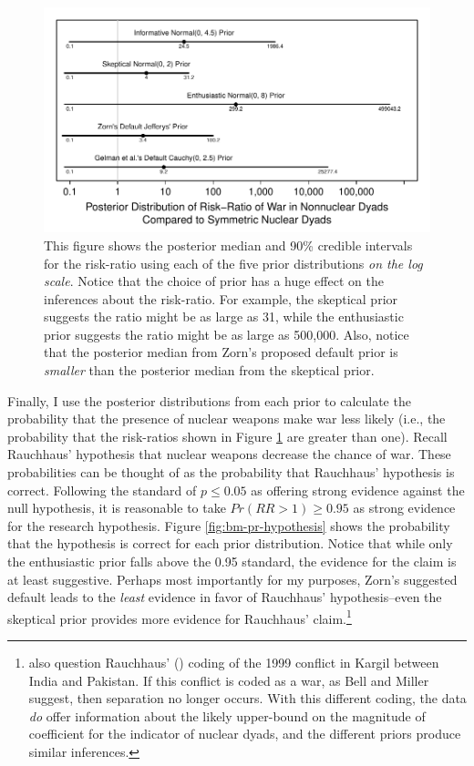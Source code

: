 \documentclass[12pt]{article}
\begin{document}
\begin{figure}[H]
\begin{center}
\includegraphics[scale = .8]{figs/bm-rr.pdf}
\caption{This figure shows the posterior median and 90\% credible intervals for the risk-ratio using each of the five prior distributions \emph{on the log scale}. Notice that the choice of prior has a huge effect on the inferences about the risk-ratio. For example, the skeptical prior suggests the ratio might be as large as 31, while the enthusiastic prior suggests the ratio might be as large as 500,000. Also, notice that the posterior median from Zorn's proposed default prior is \emph{smaller} than the posterior median from the skeptical prior.}\label{fig:bm-rr}
\end{center}
\end{figure}

%

Finally, I use the posterior distributions from each prior to calculate the probability that the presence of nuclear weapons make war less likely (i.e., the probability that the risk-ratios shown in Figure \ref{fig:bm-rr} are greater than one). Recall Rauchhaus' hypothesis that nuclear weapons decrease the chance of war. These probabilities can be thought of as the probability that Rauchhaus' hypothesis is correct. Following the standard of $p \leq 0.05$ as offering strong evidence against the null hypothesis, it is reasonable to take $Pr(RR > 1) \geq 0.95$ as strong evidence for the research hypothesis. Figure \ref{fig:bm-pr-hypothesis} shows the probability that the hypothesis is correct for each prior distribution. Notice that while only the enthusiastic prior falls above the 0.95 standard, the evidence for the claim is at least suggestive. Perhaps most importantly for my purposes, Zorn's suggested default leads to the \emph{least} evidence in favor of Rauchhaus' hypothesis--even the skeptical prior provides more evidence for Rauchhaus' claim.\footnote{\cite{BellMiller2014} also question Rauchhaus' (\citeyear{Rauchhaus2009}) coding of the 1999 conflict in Kargil between India and Pakistan. If this conflict is coded as a war, as Bell and Miller suggest, then separation no longer occurs. With this different coding, the data \textit{do} offer information about the likely upper-bound on the magnitude of coefficient for the indicator of nuclear dyads, and the different priors produce similar inferences.}
\end{document}
